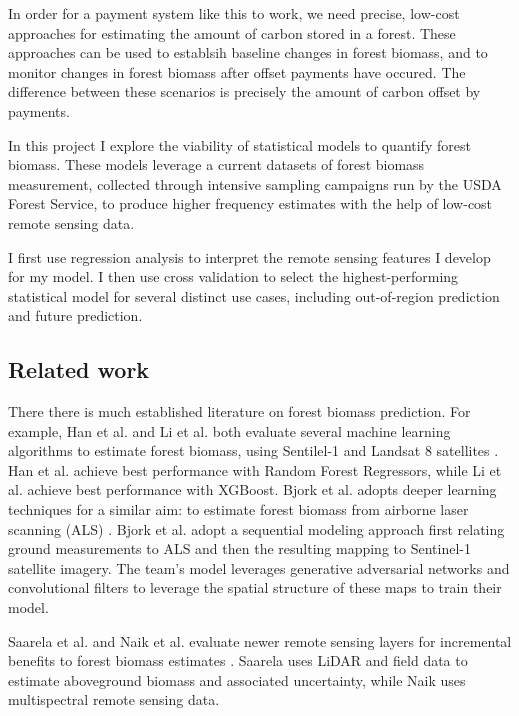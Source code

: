 \documentclass{article}
\begin{document}
In order for a payment system like this to work, we need precise, low-cost approaches for estimating the amount of carbon stored in a forest. These approaches can be used to establsih baseline changes in forest biomass, and to monitor changes in forest biomass after offset payments have occured. The difference between these scenarios is precisely the amount of carbon offset by payments. 

In this project I explore the viability of statistical models to quantify forest biomass. These models leverage a current datasets of forest biomass measurement, collected through intensive sampling campaigns run by the USDA Forest Service, to produce higher frequency estimates with the help of low-cost remote sensing data. 

I first use regression analysis to interpret the remote sensing features I develop for my model. I then use  cross validation to select the highest-performing statistical model for several distinct use cases, including out-of-region prediction and future prediction.

\subsection{Related work}

There there is much established literature on forest biomass prediction. For example, Han et al. and Li et al. both evaluate several machine learning algorithms to estimate forest biomass, using Sentilel-1 and Landsat 8 satellites \cite{Han_2022, Li_2020}. Han et al. achieve best performance with Random Forest Regressors, while Li et al. achieve best performance with XGBoost. Bjork et al. adopts deeper learning techniques for a similar aim: to estimate forest biomass from airborne laser scanning (ALS) \cite{Bjork_2021}. Bjork et al. adopt a sequential modeling approach first relating ground measurements to ALS and then the resulting mapping to Sentinel-1 satellite imagery. The team's model leverages generative adversarial networks and convolutional filters to leverage the spatial structure of these maps to train their model. 

Saarela et al. and Naik et al. evaluate newer remote sensing layers for incremental benefits to forest biomass estimates \cite{Saarela_2020, Naik_2021}. Saarela uses LiDAR and field data to estimate aboveground biomass and associated uncertainty, while Naik uses multispectral remote sensing data.
\end{document}
